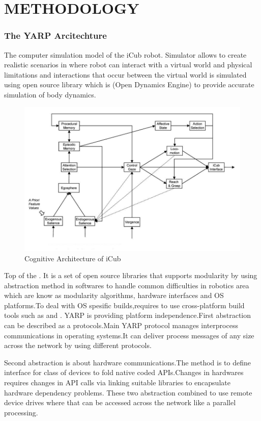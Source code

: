 \documentclass[a4paper, 11pt]{report}
\begin{document}
\chapter{METHODOLOGY}
  \subsection{The YARP Arcitechture}
The computer simulation model of the iCub robot. Simulator allows to 
create realistic scenarios in where robot can interact with a virtual world and 
physical limitations and interactions that occur between the virtual world is 
simulated using open source library which is \cite{ODE} (Open Dynamics Engine) 
to provide accurate simulation of body dynamics.
\begin{figure}[h!]
    \centering
    \includegraphics[width=1.0\linewidth]{cognitive_architecture}
    \caption{Cognitive Architecture of iCub}
    \label{fig:cognitive_architecture}
\end{figure}
Top of the \cite{YARP}. It is a set of open source 
libraries that supports modularity by using abstraction method in softwares 
to 
handle common difficulties in robotics area which are know as modularity 
algorithms, hardware interfaces and OS platforms.To deal with OS 
spesific 
builds,requires to use cross-platform build tools such as \cite{CMake} and 
\cite{ACE}.
YARP is providing platform independence.First abstraction can be described as 
a 
protocols.Main YARP protocol manages interprocess communications in 
operating 
systems.It can deliver process messages of any size across the network by 
using 
different protocols.

Second abstraction is about hardware communications.The method is to define 
interface for class of devices to fold native coded APIs.Changes in hardwares 
requires changes in API calls via linking suitable libraries to encapsulate 
hardware dependency problems. These two abstraction combined to use remote 
device drives where that can be accessed across the network like a parallel 
processing.
  
\end{document}
